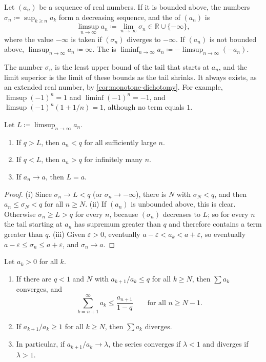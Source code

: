 \begin{definition}
\label{def:limsup}
Let $(a_n)$ be a sequence of real numbers. If it is bounded above, the numbers $\sigma_n\coloneqq\sup_{k\ge n}a_k$ form a decreasing sequence, and the  of $(a_n)$ is
\[
\limsup_{n\to\infty}a_n\coloneqq\lim_{n\to\infty}\sigma_n\in\mathbb R\cup\{-\infty\},
\]
where the value $-\infty$ is taken if $(\sigma_n)$ diverges to $-\infty$. If $(a_n)$ is not bounded above, $\limsup_{n\to\infty}a_n\coloneqq\infty$. The  is $\liminf_{n\to\infty}a_n\coloneqq-\limsup_{n\to\infty}(-a_n)$.
\end{definition}

The number $\sigma_n$ is the least upper bound of the tail that starts at $a_n$, and the limit superior is the limit of these bounds as the tail shrinks. It always exists, as an extended real number, by \cref{cor:monotone-dichotomy}. For example, $\limsup(-1)^n=1$ and $\liminf(-1)^n=-1$, and $\limsup(-1)^n(1+1/n)=1$, although no term equals $1$.

\begin{lemma}
\label{lem:limsup}
Let $L\coloneqq\limsup_{n\to\infty}a_n$.
\begin{enumerate}
\item If $q>L$, then $a_n<q$ for all sufficiently large $n$.
\item If $q<L$, then $a_n>q$ for infinitely many $n$.
\item If $a_n\to a$, then $L=a$.
\end{enumerate}
\end{lemma}

\begin{proof}
(i) Since $\sigma_n\to L<q$ (or $\sigma_n\to-\infty$), there is $N$ with $\sigma_N<q$, and then $a_n\le\sigma_N<q$ for all $n\ge N$. (ii) If $(a_n)$ is unbounded above, this is clear. Otherwise $\sigma_n\ge L>q$ for every $n$, because $(\sigma_n)$ decreases to $L$; so for every $n$ the tail starting at $a_n$ has supremum greater than $q$ and therefore contains a term greater than $q$. (iii) Given $\varepsilon>0$, eventually $a-\varepsilon<a_k<a+\varepsilon$, so eventually $a-\varepsilon\le\sigma_n\le a+\varepsilon$, and $\sigma_n\to a$.
\end{proof}

\begin{theorem}
\label{thm:ratio-test}
Let $a_k>0$ for all $k$.
\begin{enumerate}
\item If there are $q<1$ and $N$ with $a_{k+1}/a_k\le q$ for all $k\ge N$, then $\sum a_k$ converges, and
\[
\sum_{k=n+1}^\infty a_k\le\frac{a_{n+1}}{1-q}\qquad\text{for all }n\ge N-1 .
\]
\item If $a_{k+1}/a_k\ge1$ for all $k\ge N$, then $\sum a_k$ diverges.
\item In particular, if $a_{k+1}/a_k\to\lambda$, the series converges if $\lambda<1$ and diverges if $\lambda>1$.
\end{enumerate}
\end{theorem}

